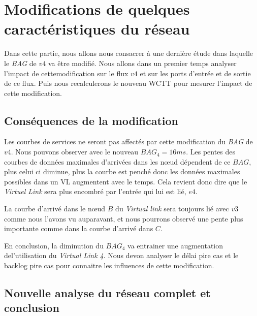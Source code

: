 \chapter{Modifications de quelques caractéristiques du réseau}
Dans cette partie, nous allons nous consacrer à une dernière étude dans laquelle le \emph{BAG} de $v4$ va être modifié. Nous allons dans un premier temps analyser l'impact de cettemodification sur le flux $v4$ et sur les ports d'entrée et de sortie de ce flux. Puis nous recalculerons le nouveau WCTT pour mesurer l'impact de cette modification.

\section{Conséquences de la modification}
Les courbes de services ne seront pas affectés par cette modification du \emph{BAG} de $v4$. Nous pouvons observer avec le nouveau $BAG_4 = 16ms$. Les pentes des courbes de données maximales d'arrivées dans les nœud dépendent de ce $BAG$, plus celui ci diminue, plus la courbe est penché donc les données maximales possibles dans un VL augmentent avec le temps. Cela revient donc  dire que le \emph{Virtuel Link} sera plus encombré par l'entrée qui lui est lié, $e4$.

La courbe d'arrivé dans le nœud $B$ du \emph{Virtual link} sera toujours lié avec $v3$ comme nous l'avons vu auparavant, et nous pourrons observé une pente plus importante comme dans la courbe d'arrivé dans $C$. 

En conclusion, la diminution du $BAG_4$ va entrainer une augmentation del'utilisation du \emph{Virtual Link 4}. Nous devon analyser le délai pire cas et le backlog pire cas pour connaitre les influences de cette modification.
\section{Nouvelle analyse du réseau complet et conclusion} 